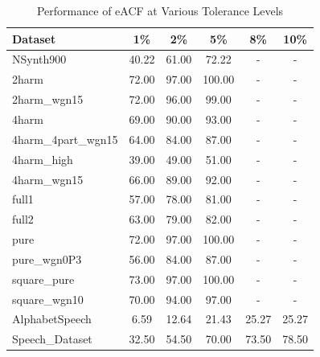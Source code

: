 \documentclass{ieeeaccess}
\begin{document}
\begin{table}[h!]
\centering
\begin{tabular}{lccccc}
\hline
\textbf{Dataset} & \textbf{1\%} & \textbf{2\%} & \textbf{5\%} & \textbf{8\%} & \textbf{10\%} \\ \hline
NSynth900 & 40.22 & 61.00 & 72.22 & - & - \\ 
2harm & 72.00 & 97.00 & 100.00 & - & - \\ 
2harm\_wgn15 & 72.00 & 96.00 & 99.00 & - & - \\ 
4harm & 69.00 & 90.00 & 93.00 & - & - \\ 
4harm\_4part\_wgn15 & 64.00 & 84.00 & 87.00 & - & - \\ 
4harm\_high & 39.00 & 49.00 & 51.00 & - & - \\
4harm\_wgn15 & 66.00 & 89.00 & 92.00 & - & - \\
full1 & 57.00 & 78.00 & 81.00 & - & - \\
full2 & 63.00 & 79.00 & 82.00 & - & - \\ 
pure & 72.00 & 97.00 & 100.00 & - & - \\ 
pure\_wgn0P3 & 56.00 & 84.00 & 87.00 & - & - \\ 
square\_pure & 73.00 & 97.00 & 100.00 & - & - \\ 
square\_wgn10 & 70.00 & 94.00 & 97.00 & - & - \\ 
AlphabetSpeech & 6.59 & 12.64 & 21.43 & 25.27 & 25.27 \\ 
Speech\_Dataset & 32.50 & 54.50 & 70.00 & 73.50 & 78.50 \\ 
\hline

\end{tabular}
\caption{Performance of eACF at Various Tolerance Levels}
\label{tab:eacf_performance}
\end{table}
\end{document}

